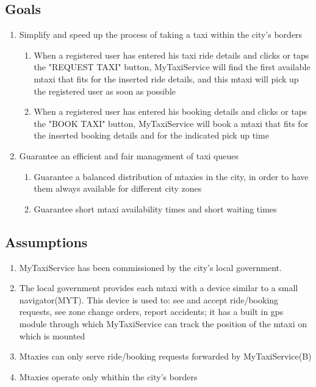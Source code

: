 \documentclass[11pt]{article} %
\begin{document}
  \subsection{Goals}
	\begin{enumerate}
	    \item Simplify and speed up the process of taking a taxi within the city's borders
		\begin{enumerate}
		      \item When a registered user has entered his taxi ride details and clicks or taps
		      the "REQUEST TAXI" button, MyTaxiService will find the first
		      available mtaxi that fits for the inserted ride details, and this mtaxi will
		      pick up the registered user as soon as possible
		
		      \item When a registered user has entered his booking details and clicks or taps
		        the "BOOK TAXI" button, MyTaxiService will book a mtaxi that fits for the
		        inserted booking details and for the indicated pick up time
		\end{enumerate}
	
	    \item Guarantee an efficient and fair management of taxi queues
	  	\begin{enumerate}
		      \item Guarantee a balanced distribution of mtaxies in the city, in order
		      to have them always available for different city zones
		
		      \item Guarantee short mtaxi availability times and short waiting times
		\end{enumerate}
	\end{enumerate}

  \subsection{Assumptions}
	\begin{enumerate}
	    \item MyTaxiService has been commissioned by the city's local government.
	
	    \item The local government provides each mtaxi with a device similar to a small navigator(MYT). This device is used
	      to: see and accept ride/booking requests, see zone change orders, report accidents; it has a built in gps module through which MyTaxiService can
	      track the position of the mtaxi on which is mounted
	
	    \item Mtaxies can only serve ride/booking requests forwarded by MyTaxiService(B)
	
	    \item Mtaxies operate only whithin the city's borders
	\end{enumerate}
\end{document}
